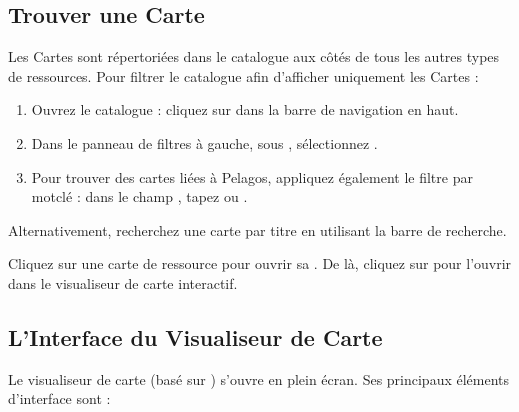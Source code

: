 \documentclass[letterpaper,10pt,english]{sphinxmanual}
\begin{document}
\subsection{Trouver une Carte}
\label{\detokenize{fr/04_explorer_cartes:trouver-une-carte}}
\sphinxAtStartPar
Les Cartes sont répertoriées dans le catalogue aux côtés de tous les autres types de
ressources. Pour filtrer le catalogue afin d’afficher uniquement les Cartes :
\begin{enumerate}
%
\item {} 
\sphinxAtStartPar
Ouvrez le catalogue : cliquez sur  dans la barre de navigation en haut.

\item {} 
\sphinxAtStartPar
Dans le panneau de filtres à gauche, sous , sélectionnez .

\item {} 
\sphinxAtStartPar
Pour trouver des cartes liées à Pelagos, appliquez également le filtre par mot\sphinxhyphen{}clé :
dans le champ , tapez  ou .

\end{enumerate}

\sphinxAtStartPar
Alternativement, recherchez une carte par titre en utilisant la barre de recherche.

\sphinxAtStartPar
Cliquez sur une carte de ressource pour ouvrir sa . De là, cliquez
sur  pour l’ouvrir dans le visualiseur de carte interactif.


\subsection{L’Interface du Visualiseur de Carte}
\label{\detokenize{fr/04_explorer_cartes:l-interface-du-visualiseur-de-carte}}
\sphinxAtStartPar
Le visualiseur de carte (basé sur ) s’ouvre en plein écran. Ses principaux
éléments d’interface sont :
\end{document}
